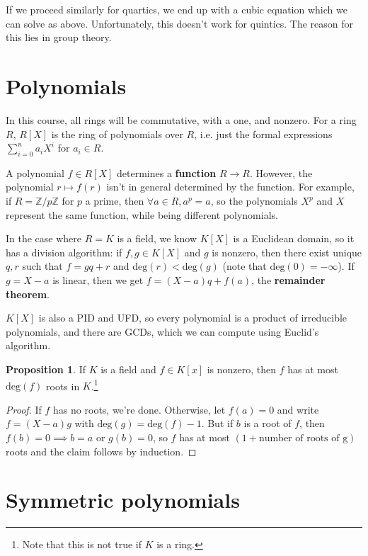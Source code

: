 \documentclass{article}
\theoremstyle{definition}
\newtheorem{prop}[theorem]{Proposition}
\begin{document}
\vspace{1mm}

If we proceed similarly for quartics, we end up with a cubic equation which we can solve as above. Unfortunately, this doesn't work for quintics. The reason for this lies in group theory.

\newpage

\section{Polynomials}

In this course, all rings will be commutative, with a one, and nonzero. For a ring $R$, $R[X]$ is the ring of polynomials over $R$, i.e. just the formal expressions $\sum_{i=0}^{n} a_i X^i$ for $a_i \in R$.

A polynomial $f \in R[X]$ determines a \textbf{function} $R \to R$. However, the polynomial $r \mapsto f(r)$ isn't in general determined by the function. For example, if $R = \mathbb{Z}/p\mathbb{Z}$ for $p$ a prime, then $\forall a \in R, a^p = a$, so the polynomials $X^p$ and $X$ represent the same function, while being different polynomials.

In the case where $R = K$ is a field, we know $K[X]$ is a Euclidean domain, so it has a division algorithm: if $f,g \in K[X]$ and $g$ is nonzero, then there exist unique $q,r$ such that $f = gq + r$ and $\text{deg}(r) < \text{deg}(g)$ (note that $\text{deg}(0) = - \infty$). If $g = X-a$ is linear, then we get $f =(X-a)q + f(a)$, the \textbf{remainder theorem}.

$K[X]$ is also a PID and UFD, so every polynomial is a product of irreducible polynomials, and there are GCDs, which we can compute using Euclid's algorithm.

\begin{prop}
    If $K$ is a field and $f \in K[x]$ is nonzero, then $f$ has at most $\text{deg}(f)$ roots in $K$.\footnote{Note that this is not true if $K$ is a ring.}
\end{prop}
\begin{proof}
    If $f$ has no roots, we're done. Otherwise, let $f(a) = 0$ and write ${f = (X-a)g}$ with $\text{deg}(g) = \text{deg}(f) - 1$. But if $b$ is a root of $f$, then ${f(b) = 0} \implies b=a$ or $g(b)=0$, so $f$ has at most $(1 + \text{number of roots of g})$ roots and the claim follows by induction.
\end{proof}

\section{Symmetric polynomials}
\end{document}
